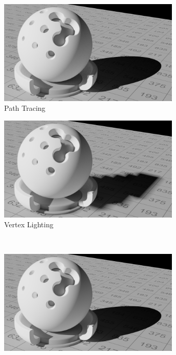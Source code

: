 	\begin{figure}[h]
		\begin{subfigure}[b]{0.5\textwidth}
			\center
			\includegraphics[width=0.95\textwidth]{pic/irrmap-shaderball-ref.png}
			\caption{Path Tracing}
		\end{subfigure}
		\begin{subfigure}[b]{0.5\textwidth}
			\center
			\includegraphics[width=0.95\textwidth]{pic/irrmap-shaderball-vmap.png}
			\caption{Vertex Lighting}
		\end{subfigure}
		\smallskip \\
		\begin{subfigure}[b]{0.5\textwidth}
			\center
			\includegraphics[width=0.95\textwidth]{pic/irrmap-shaderball-irrmap.png}

\end{subfigure}
\end{figure}
